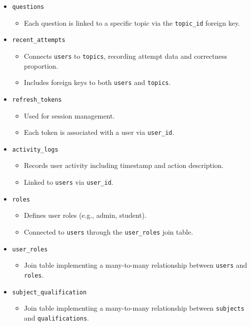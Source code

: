 \documentclass[]{final_report}
\begin{document}
\begin{itemize}
    \item \verb|questions|
    \begin{itemize}
        \item Each question is linked to a specific topic via the \verb|topic_id| foreign key.
    \end{itemize}

    \item \verb|recent_attempts|
    \begin{itemize}
        \item Connects \verb|users| to \verb|topics|, recording attempt data and correctness proportion.
        \item Includes foreign keys to both \verb|users| and \verb|topics|.
    \end{itemize}

    \item \verb|refresh_tokens|
    \begin{itemize}
        \item Used for session management.
        \item Each token is associated with a user via \verb|user_id|.
    \end{itemize}

    \item \verb|activity_logs|
    \begin{itemize}
        \item Records user activity including timestamp and action description.
        \item Linked to \verb|users| via \verb|user_id|.
    \end{itemize}

    \item \verb|roles|
    \begin{itemize}
        \item Defines user roles (e.g., admin, student).
        \item Connected to \verb|users| through the \verb|user_roles| join table.
    \end{itemize}

    \item \verb|user_roles|
    \begin{itemize}
        \item Join table implementing a many-to-many relationship between \verb|users| and \verb|roles|.
    \end{itemize}

    \item \verb|subject_qualification|
    \begin{itemize}
        \item Join table implementing a many-to-many relationship between \verb|subjects| and \verb|qualifications|.
    \end{itemize}
\end{itemize}
\end{document}

